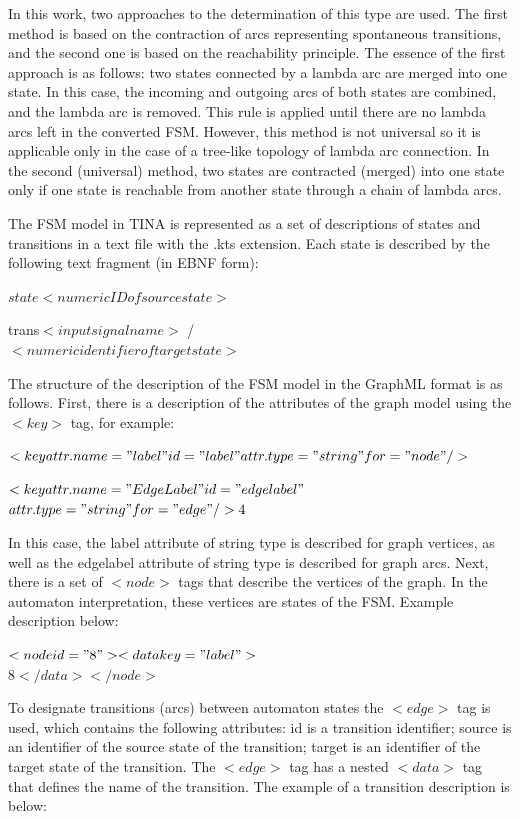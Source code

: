 \documentclass[conference]{IEEEtran}
\begin{document}
In this work, two approaches to the determination of this type are used. The first method is based on the contraction of arcs representing spontaneous transitions, and the second one is based on the reachability principle. The essence of the first approach is as follows: two states connected by a lambda arc are merged into one state. In this case, the incoming and outgoing arcs of both states are combined, and the lambda arc is removed. This rule is applied until there are no lambda arcs left in the converted FSM. However, this method is not universal so it is applicable only in the case of a tree-like topology of lambda arc connection. In the second (universal) method, two states are contracted (merged) into one state only if one state is reachable from another state through a chain of lambda arcs.

The FSM model in TINA is represented as a set of descriptions of states and transitions in a text file with the .kts extension. Each state is described by the following text fragment (in EBNF form):

    
$state <numeric ID of source state>$

trans{$<input signal name>$ / \\ $< numeric identifier of target state>$}

The structure of the description of the FSM model in the GraphML format is as follows. First, there is a description of the attributes of the graph model using the $<key>$ tag, for example:

$<key attr.name="label" id="label" attr.type="string" for="node"/>$

$<key attr.name="Edge Label" id="edgelabel" $\\$ attr.type="string" for="edge"/>4$

In this case, the label attribute of string type is described for graph vertices, as well as the edgelabel attribute of string type is described for graph arcs. Next, there is a set of $<node>$ tags that describe the vertices of the graph. In the automaton interpretation, these vertices are states of the FSM. Example description below:

$<node id="8"><data key="label">$\\$8</data></node>$

To designate transitions (arcs) between automaton states the $<edge>$ tag is used, which contains the following attributes: id is a transition identifier; source is an identifier of the source state of the transition; target is an identifier of the target state of the transition. The $<edge>$ tag has a nested $<data>$ tag that defines the name of the transition. The example of a transition description is below:
\end{document}
